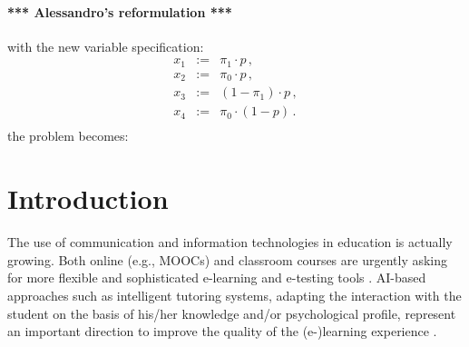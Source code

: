 \documentclass[runningheads]{llncs}
\begin{document}
	
	\paragraph{*** Alessandro's reformulation ***}
	with the new variable specification:
	\begin{eqnarray}
		x_1&:=&\pi_1 \cdot p \,,\\
		x_2&:=&\pi_0 \cdot p \,,\\
		x_3&:=&(1-\pi_1) \cdot p \,,\\
		x_4&:=& \pi_0 \cdot (1-p)\,.\\
	\end{eqnarray}
	the problem becomes:
	
	
	\section{Introduction}\label{sec:intro}
	The use of communication and information technologies in education is actually 
	growing. Both online (e.g., MOOCs) and classroom courses are urgently asking for 
	more flexible and sophisticated e-learning and e-testing tools 
	\cite{pollard2001exploring}. AI-based approaches such as intelligent tutoring systems, 
	adapting the interaction with the student on the basis of his/her knowledge and/or 
	psychological profile, represent an important direction to improve the quality of the 
	(e-)learning experience \cite{burns2014intelligent}.
	
\end{document}
